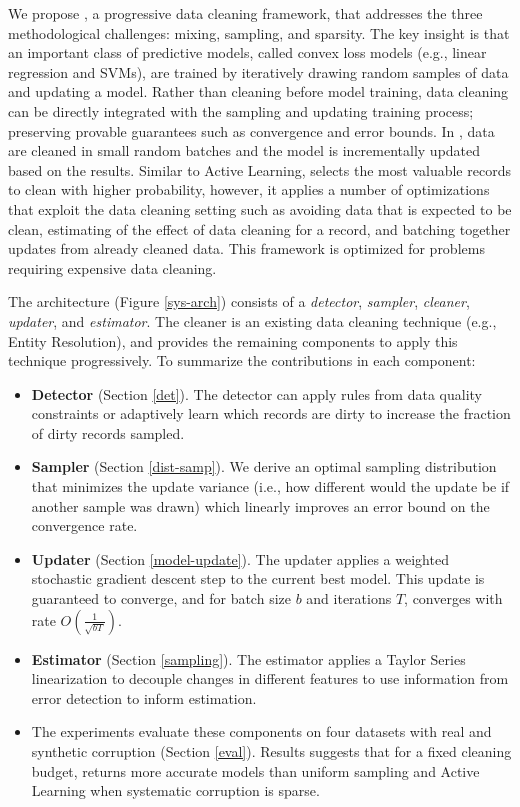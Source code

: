 We propose \sys, a progressive data cleaning framework, that addresses the three methodological challenges: mixing, sampling, and sparsity.
The key insight is that an important class of predictive models, called convex loss models (e.g., linear regression and SVMs), are trained by iteratively drawing random samples of data and updating a model\cite{bertsekas2011incremental}.
Rather than cleaning before model training, data cleaning can be directly integrated with the sampling and updating training process; preserving provable guarantees such as convergence and error bounds.
In \sys, data are cleaned in small random batches and the model is incrementally updated based on the results.
Similar to Active Learning, \sys selects the most valuable records to clean with higher probability, however, it applies a number of optimizations that exploit the data cleaning setting such as avoiding data that is expected to be clean, estimating of the effect of data cleaning for a record, and batching together updates from already cleaned data.
This framework is optimized for problems requiring expensive data cleaning.

The \sys architecture (Figure \ref{sys-arch}) consists of a \emph{detector}, \emph{sampler}, \emph{cleaner}, \emph{updater}, and \emph{estimator}.
The cleaner is an existing data cleaning technique (e.g., Entity Resolution), and \sys provides the remaining components to apply this technique progressively.
To summarize the contributions in each component:
\begin{itemize}[noitemsep]
\item \textbf{Detector} (Section \ref{det}). The detector can apply rules from data quality constraints or adaptively learn which records are dirty to increase the fraction of dirty records sampled.
\item \textbf{Sampler} (Section \ref{dist-samp}). We derive an optimal sampling distribution that minimizes the update variance (i.e., how different would the update be if another sample was drawn) which linearly improves an error bound on the convergence rate.
\item \textbf{Updater} (Section \ref{model-update}). The updater applies a weighted stochastic gradient descent step to the current best model. This update is guaranteed to converge, and for batch size $b$ and iterations $T$, converges with rate $O(\frac{1}{\sqrt{bT}})$. 
\item \textbf{Estimator} (Section \ref{sampling}). The estimator applies a Taylor Series linearization to decouple changes in different features to use information from error detection to inform estimation.
\item The experiments evaluate these components on four datasets with real and synthetic corruption (Section \ref{eval}). Results suggests that for a fixed cleaning budget, \sys returns more accurate models than uniform sampling and Active Learning when systematic corruption is sparse.

\end{itemize}






